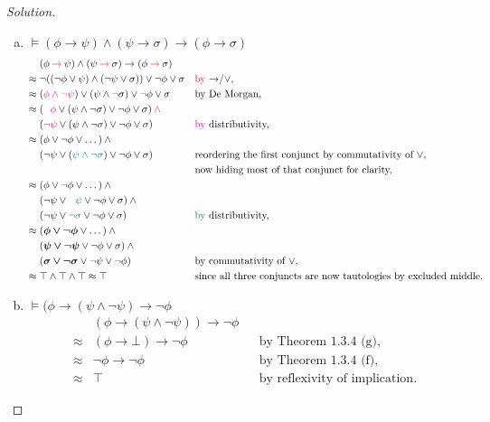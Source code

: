 \documentclass[letter]{article}
\theoremstyle{definition}
\newenvironment{solution}
{\begin{proof}[Solution]}
	{\end{proof}}
\begin{document}
\begin{solution}
\begin{enumerate}[(a)]
  \item $\models (\phi \to \psi) \land (\psi \to \sigma) \to (\phi \to \sigma)$
\begin{align*}
    & (\phi \colop{red}{\to} \psi) \land (\psi \colop{red}{\to} \sigma) \to (\phi \colop{red}{\to} \sigma) &&
\\ \approx{}
    & \neg ((\neg \phi \lor \psi) \land (\neg \psi \lor \sigma)) \lor \neg \phi \lor \sigma
    && \text{\textcolor{red}{by} $\to$/$\lor$,}
\\ \approx{}
    & ({\color{magenta}\phi \land \neg \psi}) \lor (\psi \land \neg \sigma) \lor \neg \phi \lor \sigma
    && \text{by De Morgan,}
\\ \approx{}
    & ({\color{magenta}\phantom{\neg}\phi} \lor (\psi \land \neg \sigma) \lor \neg \phi \lor \sigma) \colop{magenta}{\land} {} &&
\\  & ({\color{magenta}         \neg \psi} \lor (\psi \land \neg \sigma) \lor \neg \phi \lor \sigma)
    && \text{\textcolor{magenta}{by} distributivity,}
\\ \approx{}
    & (\phi \lor \neg \phi \lor \dots) \land {} &&
\\
    & (\neg \psi \lor ({\color{teal}\psi \land \neg \sigma}) \lor \neg \phi \lor \sigma)
    && \text{reordering the first conjunct by commutativity of $\lor$,}
\\ & && \text{now hiding most of that conjunct for clarity,}
\\ \approx{}
    & (\phi \lor \neg \phi \lor \dots) \land {} &&
\\  & (\neg \psi \lor {\color{teal}\phantom{\neg}\psi}   \lor \neg \phi \lor \sigma) \land {} &&
\\  & (\neg \psi \lor {\color{teal}         \neg \sigma} \lor \neg \phi \lor \sigma)
    && \text{\textcolor{teal}{by} distributivity,}
\\ \approx {}
    & (\bm{\phi \lor \neg \phi} \lor \dots) \land {} &&
\\  & (\bm{\psi \lor \neg \psi} \lor \neg \phi \lor \sigma) \land {} &&
\\  & (\bm{\sigma \lor \neg \sigma} \lor \neg \psi \lor \neg \phi)
    && \text{by commutativity of $\lor$,}
\\ \approx {}
    & \top \land \top \land \top \approx \top
    && \text{since all three conjuncts are now tautologies by excluded middle.}
\end{align*}

  \item $\models (\phi \to (\psi \land \neg \psi) \to \neg \phi$
\begin{align*}
  & (\phi \to (\psi \land \neg \psi)) \to \neg \phi &&
\\ \approx{}
  & (\phi \to \bot) \to \neg \phi
  && \text{by Theorem 1.3.4 (g),}
\\ \approx{}
  & \neg \phi \to \neg \phi
  && \text{by Theorem 1.3.4 (f),}
\\ \approx{}
  & \top && \text{by reflexivity of implication.}
\end{align*}


\end{enumerate}
\end{solution}
\end{document}
